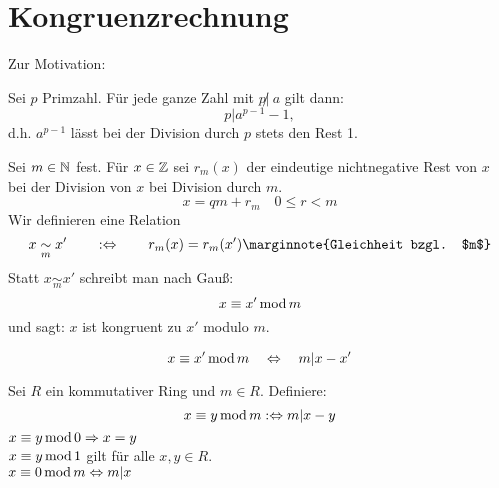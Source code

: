\section{Kongruenzrechnung}
\label{sec:para3}
	Zur Motivation:
	
\begin{satz} \label{satz_3.1}
	Sei $p$ Primzahl. Für jede ganze Zahl mit $p \not | \ a$ gilt dann:
	\[ p | a^{p-1} - 1, \]
	d.h. $a^{p-1}$ lässt bei der Division durch $p$ stets den Rest 1. 
\end{satz}

\begin{defn}[Kongruenz in $\ZZ$] \label{def_3.1}
	Sei $m \in \mathbb{N}$ fest. Für $x\in \mathbb{Z}$ sei $r_m(x)$ der eindeutige nichtnegative Rest von $x$ bei der Division von $x$ bei Division durch $m$. 
	\[ x = qm + r_m \quad 0 \leq r < m \]
	Wir definieren eine Relation
	\[ x \underset{m}{\sim} x' \qquad :\Leftrightarrow \qquad r_m(x) = r_m(x') \marginnote{Gleichheit bzgl. $m$}\]
	Statt $x \underset{m}{\sim} x'$ schreibt man nach Gauß:
	\[ x \equiv x' \operatorname{mod} m \]
	und sagt: $x$ ist kongruent zu $x'$ modulo $m$. 
\end{defn}

\begin{falko} \label{F3.1} 
	\[ x \equiv x' \operatorname{mod} m \quad \Leftrightarrow \quad m | x-x' \]	
\end{falko}

\setcounter{countdef}{0}
\begin{defn} \label{def_3.1a}
	Sei $R$ ein kommutativer Ring und $m \in R$. Definiere:
	\[ x \equiv y \operatorname{mod} m :\Leftrightarrow m | x-y \]
	$x \equiv y \operatorname{mod} 0 \Rightarrow x=y$ \\
	$x \equiv y \operatorname{mod} 1$ gilt für alle $x,y \in R$. \\
	$x \equiv 0 \operatorname{mod} m \Leftrightarrow m | x$
\end{defn}


